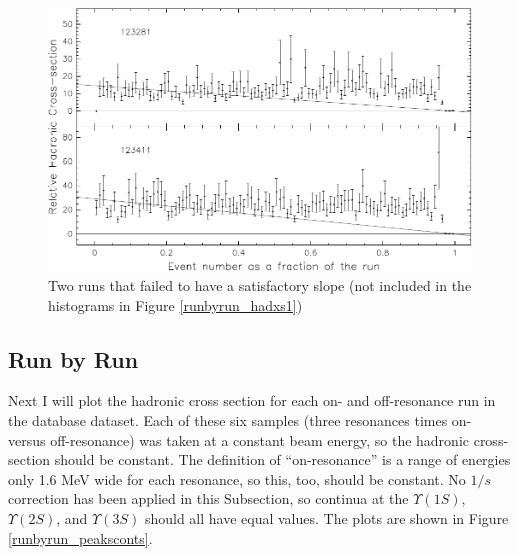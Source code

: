 \begin{figure}[p]
  \includegraphics[width=\linewidth]{plots/runbyrun_hadxs2}
  \caption{\label{runbyrun_hadxs2} Two runs that failed to have a
  satisfactory slope (not included in the histograms in Figure
  \ref{runbyrun_hadxs1})}
\end{figure}

\subsection{Run by Run}

Next I will plot the hadronic cross section for each on- and
off-resonance run in the database dataset.  Each of these six samples
(three resonances times on- versus off-resonance) was taken at a
constant beam energy, so the hadronic cross-section should be
constant.  The definition of ``on-resonance'' is a range of energies
only 1.6 MeV wide for each resonance, so this, too, should be
constant.  No $1/s$ correction has been applied in this Subsection, so
continua at the $\Upsilon(1S)$, $\Upsilon(2S)$, and $\Upsilon(3S)$
should all have equal values.  The plots are shown in Figure
\ref{runbyrun_peaksconts}.

